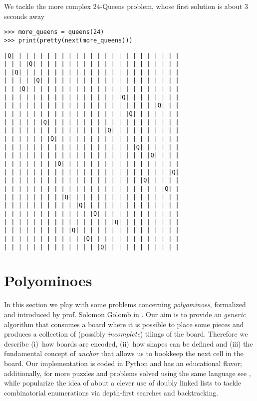 \begin{example}
We tackle the more complex $24$-Queens problem, whose first solution is about
$3$ seconds away 
\begin{verbatim}
>>> more_queens = queens(24)
>>> print(pretty(next(more_queens)))
\end{verbatim}
\vfill
\begin{Verbatim}[baselinestretch=0.1]
|Q| | | | | | | | | | | | | | | | | | | | | | | |
| | | |Q| | | | | | | | | | | | | | | | | | | | |
| |Q| | | | | | | | | | | | | | | | | | | | | | |
| | | | |Q| | | | | | | | | | | | | | | | | | | |
| | |Q| | | | | | | | | | | | | | | | | | | | | |
| | | | | | | | | | | | | | | | |Q| | | | | | | |
| | | | | | | | | | | | | | | | | | | | | |Q| | |
| | | | | | | | | | | | | | | | | |Q| | | | | | |
| | | | | |Q| | | | | | | | | | | | | | | | | | |
| | | | | | | | | | | | | | |Q| | | | | | | | | |
| | | | | | |Q| | | | | | | | | | | | | | | | | |
| | | | | | | | | | | | | | | | | | |Q| | | | | |
| | | | | | | | | | | | | | | | | | | | |Q| | | |
| | | | | | | |Q| | | | | | | | | | | | | | | | |
| | | | | | | | | | | | | | | | | | | | | | | |Q|
| | | | | | | | | | | | | | | | | | | |Q| | | | |
| | | | | | | | | | | | | | | | | | | | | | |Q| |
| | | | | | | | |Q| | | | | | | | | | | | | | | |
| | | | | | | | | | |Q| | | | | | | | | | | | | |
| | | | | | | | | | | | |Q| | | | | | | | | | | |
| | | | | | | | | | | | | | | |Q| | | | | | | | |
| | | | | | | | | |Q| | | | | | | | | | | | | | |
| | | | | | | | | | | |Q| | | | | | | | | | | | |
| | | | | | | | | | | | | |Q| | | | | | | | | | |
\end{Verbatim}
\end{example}

\section{Polyominoes}

In this section we play with some problems concerning \textit{polyominoes},
formalized and introduced by prof. Solomon Golomb in \citep{Golomb:1996}.  Our
aim is to provide an \textit{generic} algorithm that consumes a board where it
is possible to place some pieces and produces a collection of (possibly
\textit{incomplete}) tilings of the board. Therefore we describe (i)~how boards
are encoded, (ii)~how shapes can be defined and (iii) the fundamental concept
of \textit{anchor} that allows us to bookkeep the next  cell in the
board. Our implementation is coded in Python and has an educational flavor;
additionally, for more puzzles and problems solved using the same language see
\citep{Goodger:polyominoes}, while \citep{knuth:dancing:links} popularize the
idea of \citep{HITOTUMATU1979174} about a clever use of doubly linked lists to
tackle combinatorial enumerations via depth-first searches and backtracking.

